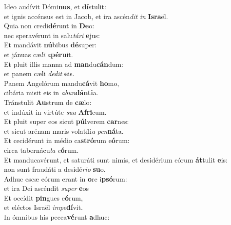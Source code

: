 \oddverse Ideo audívit Dómi\textbf{nus}, et \textbf{dí}stulit:~\*\\
\oddverse et ignis accénsus est in Jacob, et ira ascén\textit{dit} \textit{in} \textbf{Is}\textbf{ra}ël.\\
\evenverse Quia non credi\textbf{dé}runt in \textbf{De}o:~\*\\
\evenverse nec speravérunt in salu\textit{tá}\textit{ri} \textbf{e}jus:\\
\oddverse Et mandávit \textbf{nú}bibus \textbf{dé}super:~\*\\
\oddverse et jánuas cæ\textit{li} \textit{a}\textbf{pé}\textbf{ru}it.\\
\evenverse Et pluit illis manna ad \textbf{man}du\textbf{cán}dum:~\*\\
\evenverse et panem cæli \textit{de}\textit{dit} \textbf{e}is.\\
\oddverse Panem Angelórum mandu\textbf{cá}vit \textbf{ho}mo,~\*\\
\oddverse cibária misit eis in \textit{a}\textit{bun}\textbf{dán}\textbf{ti}a.\\
\evenverse Tránstulit \textbf{Au}strum de \textbf{cæ}lo:~\*\\
\evenverse et indúxit in virtúte \textit{su}\textit{a} \textbf{A}\textbf{fri}cum.\\
\oddverse Et pluit super eos sicut \textbf{púl}verem \textbf{car}nes:~\*\\
\oddverse et sicut arénam maris volatíli\textit{a} \textit{pen}\textbf{ná}ta.\\
\evenverse Et cecidérunt in médio ca\textbf{stró}rum e\textbf{ó}rum:~\*\\
\evenverse circa tabernácu\textit{la} \textit{e}\textbf{ó}rum.\\
\oddverse Et manducavérunt, et saturáti sunt nimis, et desidérium eórum \textbf{át}tulit \textbf{e}is:~\*\\
\oddverse non sunt fraudáti a desidé\textit{ri}\textit{o} \textbf{su}o.\\
\evenverse Adhuc escæ eórum erant in \textbf{o}re i\textbf{psó}rum:~\*\\
\evenverse et ira Dei ascéndit \textit{su}\textit{per} \textbf{e}os\\
\oddverse Et occídit \textbf{pin}gues e\textbf{ó}rum,~\*\\
\oddverse et eléctos Israël \textit{im}\textit{pe}\textbf{dí}vit.\\
\evenverse In ómnibus his pecca\textbf{vé}runt \textbf{a}dhuc:~\*\\
